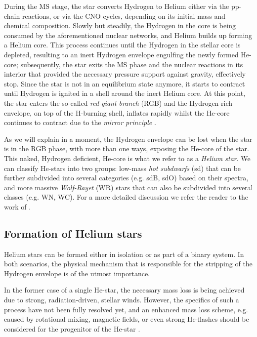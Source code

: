 \documentclass[../../main/thesis_msc.tex]{subfiles}
\begin{document}
    	During the MS stage, the star converts Hydrogen to Helium either via the pp-chain reactions, or via the CNO cycles, depending on its initial mass and chemical composition. Slowly but steadily, the Hydrogen in the core is being consumed by the aforementioned nuclear networks, and Helium builds up forming a Helium core. This process continues until the Hydrogen in the stellar core is depleted, resulting to an inert Hydrogen envelope engulfing the newly formed He-core; subsequently, the star exits the MS phase and the nuclear reactions in its interior that provided the necessary pressure support against gravity, effectively stop. Since the star is not in an equilibrium state anymore, it starts to contract until Hydrogen is ignited in a shell around the inert Helium core. At this point, the star enters the so-called \emph{red-giant branch} (RGB) and the Hydrogen-rich envelope, on top of the H-burning shell, inflates rapidly whilst the He-core continues to contract due to the \emph{mirror principle} \citep[see][p.~369]{Kipp_book}.
    	
    	As we will explain in a moment, the Hydrogen envelope can be lost when the star is in the RGB phase, with more than one ways, exposing the He-core of the star. This naked, Hydrogen deficient, He-core is what we refer to as a \emph{Helium star}. We can classify He-stars into two groups: low-mass \emph{hot subdwarfs} (sd) that can be further subdivided into several categories (e.g. sdB, sdO) based on their spectra, and more massive \emph{Wolf-Rayet} (WR) stars that can also be subdivided into several classes (e.g. WN, WC). For a more detailed discussion we refer the reader to the work of \cite{Han2002, Han2003, Heber2009, Chiosi86, langer12}.


			\subsection{Formation of Helium stars}
			
				Helium stars can be formed either in isolation or as part of a binary system. In both scenarios, the physical mechanism that is responsible for the stripping of the Hydrogen envelope is of the utmost importance.
				
				In the former case of a single He-star, the necessary mass loss is being achieved due to strong, radiation-driven, stellar winds. However, the specifics of such a process have not been fully resolved yet, and an enhanced mass loss scheme, e.g. caused by rotational mixing, magnetic fields, or even strong He-flashes should be considered for the progenitor of the He-star \citep{Sweigart, Heber2009}. 
				
\end{document}
